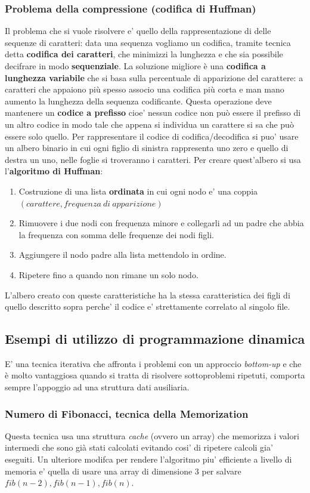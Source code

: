 \documentclass{article}
\begin{document}
\subsubsection{Problema della compressione (codifica di Huffman)}
Il problema che si vuole risolvere e' quello della rappresentazione di delle sequenze di caratteri: data una sequenza vogliamo un codifica, tramite tecnica detta \textbf{codifica dei caratteri}, che minimizzi la lunghezza e che sia possibile decifrare in modo \textbf{sequenziale}.
La soluzione migliore è una \textbf{codifica a lunghezza variabile} che si basa sulla percentuale di apparizione del carattere:
 a caratteri che appaiono più spesso associo una codifica più corta e man mano aumento la lunghezza della sequenza codificante.
Questa operazione deve mantenere un \textbf{codice a prefisso} cioe' nessun codice non può essere il prefisso di un altro codice in modo tale che appena si individua un carattere si sa che può essere solo quello. 
Per rappresentare il codice di codifica/decodifica si puo' usare un albero binario in cui ogni figlio di sinistra rappresenta uno zero e quello di destra un uno, nelle foglie si troveranno i caratteri.
Per creare quest'albero si usa l'\textbf{algoritmo di Huffman}:
\begin{enumerate}
    \item Costruzione di una lista \textbf{ordinata} in cui ogni nodo e' una coppia $(carattere, frequenza\ di\ apparizione)$
    \item Rimuovere i due nodi con frequenza minore e collegarli ad un padre che abbia la frequenza con somma delle frequenze dei nodi figli.
    \item Aggiungere il nodo padre alla lista mettendolo in ordine.
    \item Ripetere fino a quando non rimane un solo nodo. 
\end{enumerate}
L'albero creato con queste caratteristiche ha la stessa caratteristica dei figli di quello descritto sopra perche' il codice e' strettamente correlato al singolo file.


\subsection{Esempi di utilizzo di programmazione dinamica}
E' una tecnica iterativa che affronta i problemi con un approccio \textit{bottom-up} e che è molto vantaggiosa quando si tratta di risolvere sottoproblemi ripetuti, comporta sempre l'appoggio ad una struttura dati ausiliaria.
\subsubsection{Numero di Fibonacci, tecnica della Memorization}
Questa tecnica usa una struttura \textit{cache} (ovvero un array) che memorizza i valori intermedi che sono già stati calcolati 
evitando cosi' di ripetere calcoli gia' eseguiti. 
Un ulteriore modifca per rendere l'algoritmo piu' efficiente a livello di memoria e' quella di usare una array di dimensione 3 per salvare $fib(n-2), fib(n-1), fib(n)$.
\end{document}
